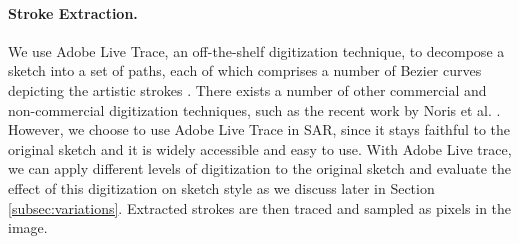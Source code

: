 



\vspace{-2mm}
\paragraph{Stroke Extraction.} We use Adobe Live Trace, an off-the-shelf digitization technique, to decompose a sketch into a set of paths, each of which comprises a number of Bezier curves depicting the artistic strokes \cite{adobe123}. There exists a number of other commercial and non-commercial digitization techniques, such as the recent work by Noris et al. . However, we choose to use Adobe Live Trace in SAR, since it stays faithful to the original sketch and it is widely accessible and easy to use. With Adobe Live trace, we can apply different levels of digitization to the original sketch and evaluate the effect of this digitization on sketch style as we discuss later in Section \ref{subsec:variations}. Extracted strokes are then traced and sampled as pixels in the image.

